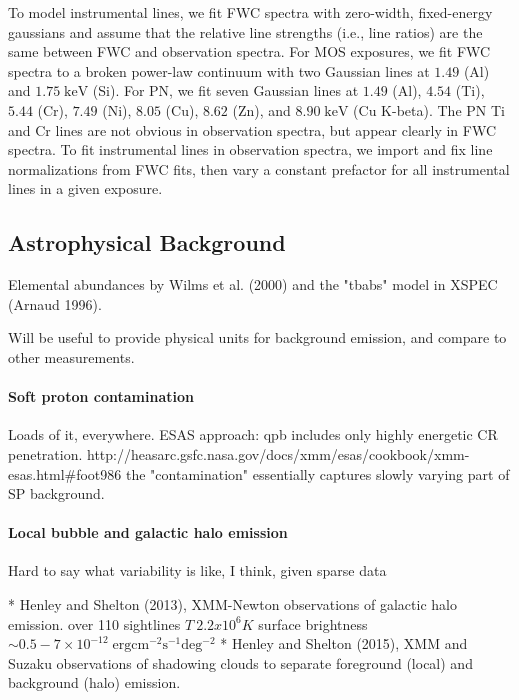 \documentclass[twocolumn,tighten,trackchanges]{aastex6}
\newcommand*{\mt}{\mathrm}
\newcommand*{\unit}[1]{\;\mt{#1}}  %
\newcommand*{\abt}{\mathord{\sim}} %
\begin{document}
To model instrumental lines, we fit FWC spectra with zero-width, fixed-energy
gaussians and assume that the relative line strengths (i.e., line ratios) are
the same between FWC and observation spectra.
For MOS exposures, we fit FWC spectra to a broken power-law continuum with two
Gaussian lines at $1.49$ (Al) and $1.75 \unit{keV}$ (Si).
For PN, we fit seven Gaussian lines at $1.49$ (Al), $4.54$ (Ti), $5.44$ (Cr),
$7.49$ (Ni), $8.05$ (Cu), $8.62$ (Zn), and $8.90 \unit{keV}$ (Cu K-beta).
The PN Ti and Cr lines are not obvious in observation spectra, but
appear clearly in FWC spectra.
To fit instrumental lines in observation spectra, we import and fix line
normalizations from FWC fits, then vary a constant prefactor for all
instrumental lines in a given exposure.

\subsection{Astrophysical Background}

Elemental abundances by Wilms et al. (2000)
and the "tbabs" model in XSPEC (Arnaud 1996).

Will be useful to provide physical units for background emission, and compare
to other measurements.

\paragraph{Soft proton contamination}

Loads of it, everywhere.
ESAS approach: qpb includes only highly energetic CR penetration.
http://heasarc.gsfc.nasa.gov/docs/xmm/esas/cookbook/xmm-esas.html#foot986
the "contamination" essentially captures slowly varying part of SP background.

\paragraph{Local bubble and galactic halo emission}

Hard to say what variability is like, I think, given sparse data

* Henley and Shelton (2013), XMM-Newton observations of galactic halo emission.
  over 110 sightlines
    $T ~ 2.2 x 10^6 K$
    surface brightness $\abt 0.5-7 \times 10^{-12} \unit{erg cm^{-2} s^{-1} deg^{-2}}$
* Henley and Shelton (2015), XMM and Suzaku observations of shadowing clouds
  to separate foreground (local) and background (halo) emission.
\end{document}
